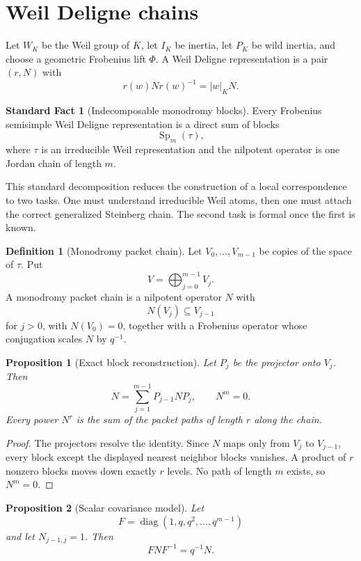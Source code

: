 \documentclass[11pt]{amsart}
\newtheorem{proposition}[proposition]{Proposition}
\theoremstyle{definition}
\newtheorem{definition}[definition]{Definition}
\newtheorem{standardfact}[standardfact]{Standard Fact}
\theoremstyle{remark}
\newcommand{\abs}[1]{\left\lvert#1\right\rvert}
\begin{document}
\section{Weil Deligne chains}\label{sec:wd}

Let \(W_K\) be the Weil group of \(K\), let \(I_K\) be inertia, let \(P_K\) be wild inertia, and choose a geometric Frobenius lift \(\Phi\). A Weil Deligne representation is a pair \((r,N)\) with
\[
r(w)Nr(w)^{-1}=\abs{w}_K N.
\]

\begin{standardfact}[Indecomposable monodromy blocks]\label{fact:spdecomp}
Every Frobenius semisimple Weil Deligne representation is a direct sum of blocks
\[
\operatorname{Sp}_m(\tau),
\]
where \(\tau\) is an irreducible Weil representation and the nilpotent operator is one Jordan chain of length \(m\).
\end{standardfact}

This standard decomposition reduces the construction of a local correspondence to two tasks. One must understand irreducible Weil atoms, then one must attach the correct generalized Steinberg chain. The second task is formal once the first is known.

\begin{definition}[Monodromy packet chain]\label{def:monodromy_chain}
Let \(V_0,\ldots,V_{m-1}\) be copies of the space of \(\tau\). Put
\[
V=\bigoplus_{j=0}^{m-1}V_j.
\]
A monodromy packet chain is a nilpotent operator \(N\) with
\[
N(V_j)\subseteq V_{j-1}
\]
for \(j>0\), with \(N(V_0)=0\), together with a Frobenius operator whose conjugation scales \(N\) by \(q^{-1}\).
\end{definition}

\begin{proposition}[Exact block reconstruction]\label{prop:monodromy_reconstruction}
Let \(P_j\) be the projector onto \(V_j\). Then
\[
N=\sum_{j=1}^{m-1}P_{j-1}NP_j,
\qquad
N^m=0.
\]
Every power \(N^r\) is the sum of the packet paths of length \(r\) along the chain.
\end{proposition}

\begin{proof}
The projectors resolve the identity. Since \(N\) maps only from \(V_j\) to \(V_{j-1}\), every block except the displayed nearest neighbor blocks vanishes. A product of \(r\) nonzero blocks moves down exactly \(r\) levels. No path of length \(m\) exists, so \(N^m=0\).
\end{proof}

\begin{proposition}[Scalar covariance model]\label{prop:scalar_covariance}
Let
\[
F=\operatorname{diag}(1,q,q^2,\ldots,q^{m-1})
\]
and let \(N_{j-1,j}=1\). Then
\[
FNF^{-1}=q^{-1}N.
\]
\end{proposition}
\end{document}

